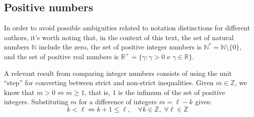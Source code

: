 \subsection*{Positive numbers}

In order to avoid possible ambiguities
related to notation distinctions for different authors,
it's worth noting that, in the context of this text,
the set of natural numbers $\mathds{N}$ include the zero,
the set of positive integer numbers is
$\mathds{N}^* = \mathds{N} \setminus \{0\}$,
and the set of positive real numbers is
$\mathds{R}^+ =
 \{\gamma: \gamma > 0 \text{ e } \gamma \in \mathds{R}\}$.

A relevant result from comparing integer numbers
consists of using the unit ``step''
for converting between strict and non-strict inequalities.
Given $m \in \mathds{Z}$, we know that $m > 0 \iff m \ge 1$,
that is, $1$ is the infimum of the set of positive integers.
Substituting $m$ for a difference of integers $m = \ell - k$ gives:
\begin{equation}\label{int+1}
  k < \ell \iff k + 1 \le \ell,
  \quad \forall k \in \mathds{Z}, \; \forall \ell \in \mathds{Z}
\end{equation}
